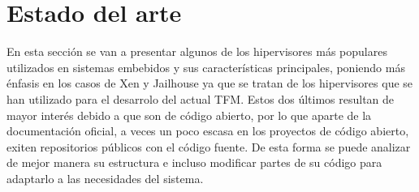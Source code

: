\chapter{Estado del arte}
En esta sección se van a presentar algunos de los hipervisores más populares utilizados en sistemas embebidos y sus características principales, poniendo más énfasis en los casos de Xen y Jailhouse ya que se tratan de los hipervisores que se han utilizado para el desarrolo del actual TFM. Estos dos últimos resultan de mayor interés debido a que son de código abierto, por lo que aparte de la documentación oficial, a veces un poco escasa en los proyectos de código abierto, exiten repositorios públicos con el código fuente. De esta forma se puede analizar de mejor manera su estructura e incluso modificar partes de su código para adaptarlo a las necesidades del sistema.

